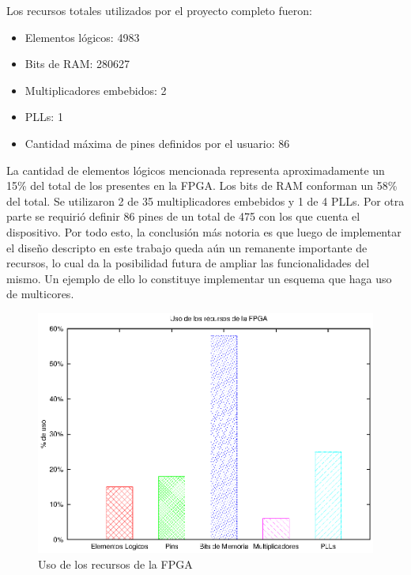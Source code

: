 Los recursos totales utilizados por el proyecto completo fueron:
\begin{itemize}
\item Elementos lógicos: 4983
	\item Bits de RAM: 280627
	\item Multiplicadores embebidos: 2
	\item PLLs: 1
	\item Cantidad máxima de pines definidos por el usuario: 86
\end{itemize}

La cantidad de elementos lógicos mencionada representa aproximadamente un 15\% del total de los presentes en la FPGA. Los bits de RAM conforman un 58\% del total. Se utilizaron 2 de 35 multiplicadores embebidos y 1 de 4 PLLs. Por otra parte se requirió definir 86 pines de un total de 475 con los que cuenta el dispositivo. Por todo esto, la conclusión más notoria es que luego de implementar el diseño descripto en este trabajo queda aún un remanente importante de recursos, lo cual da la posibilidad futura de ampliar las funcionalidades del mismo. Un ejemplo de ello lo constituye implementar un esquema que haga uso de multicores.

\begin{figure}[H]
  \centering
	\includegraphics[scale=0.70]{4-implementacion/graf/fpga.eps}
  \caption{Uso de los recursos de la FPGA}
  \label{fig:fpga}
\end{figure}



